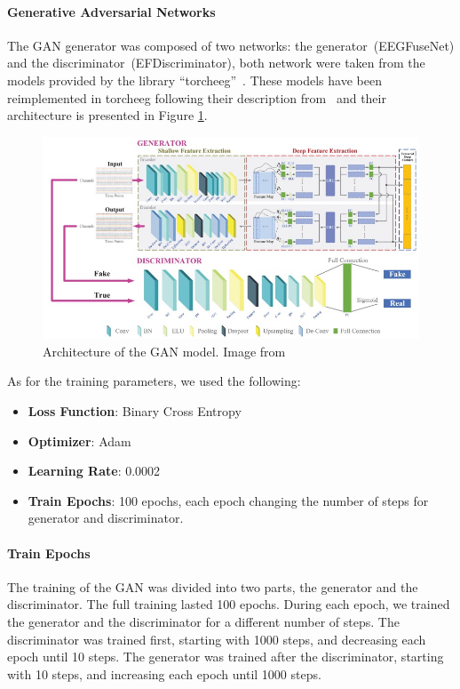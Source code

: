 \paragraph*{Generative Adversarial Networks}
The GAN generator was composed of two networks: the generator~(EEGFuseNet) and the discriminator~(EFDiscriminator), both network were taken from the models provided by the library ``torcheeg''~\cite{zhang2024torcheeg}.
These models have been reimplemented in torcheeg following their description from~\cite{liang2021eegfusenet} and their architecture is presented in Figure \ref{fig:gan_paper}.
\begin{figure}[!htbp]
    \centering
    \includegraphics[width=\textwidth]{Figures/Methodology/GAN}
    \caption{Architecture of the GAN model. Image from~\cite{liang2021eegfusenet}}\label{fig:gan_paper}
\end{figure}


As for the training parameters, we used the following:
\begin{itemize}
    \item \textbf{Loss Function}: Binary Cross Entropy
    \item \textbf{Optimizer}: Adam
    \item \textbf{Learning Rate}: 0.0002
    \item \textbf{Train Epochs}: 100 epochs, each epoch changing the number of steps for generator and discriminator.
\end{itemize}
\paragraph*{Train Epochs}
The training of the GAN was divided into two parts, the generator and the discriminator.
The full training lasted 100 epochs.
During each epoch, we trained the generator and the discriminator for a different number of steps.
The discriminator was trained first, starting with 1000 steps, and decreasing each epoch until 10 steps.
The generator was trained after the discriminator, starting with 10 steps, and increasing each epoch until 1000 steps.


